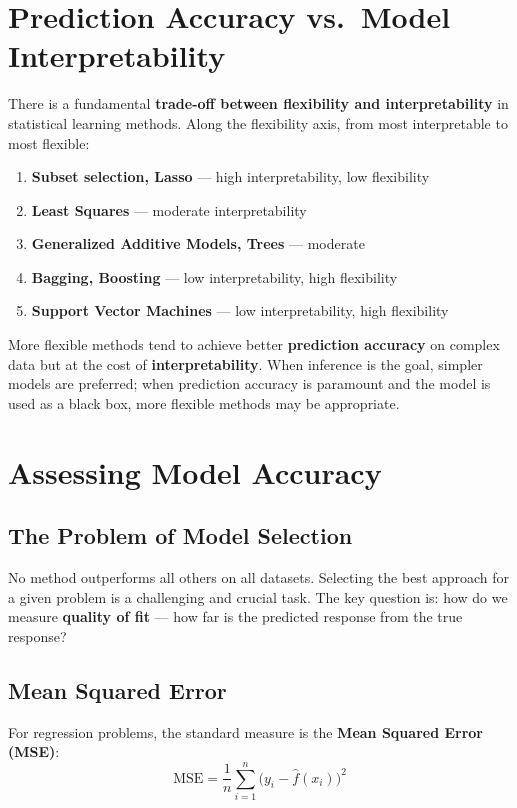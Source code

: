 \documentclass[11pt,a4paper]{article}
\theoremstyle{definition}
\theoremstyle{plain}
\theoremstyle{remark}
\begin{document}
\section{Prediction Accuracy vs.\ Model Interpretability}

There is a fundamental \textbf{trade-off between flexibility and interpretability} in statistical learning methods. Along the flexibility axis, from most interpretable to most flexible:

\begin{enumerate}
    \item \textbf{Subset selection, Lasso} — high interpretability, low flexibility
    \item \textbf{Least Squares} — moderate interpretability
    \item \textbf{Generalized Additive Models, Trees} — moderate
    \item \textbf{Bagging, Boosting} — low interpretability, high flexibility
    \item \textbf{Support Vector Machines} — low interpretability, high flexibility
\end{enumerate}

More flexible methods tend to achieve better \textbf{prediction accuracy} on complex data but at the cost of \textbf{interpretability}. When inference is the goal, simpler models are preferred; when prediction accuracy is paramount and the model is used as a black box, more flexible methods may be appropriate.


\section{Assessing Model Accuracy}

\subsection{The Problem of Model Selection}

No method outperforms all others on all datasets. Selecting the best approach for a given problem is a challenging and crucial task. The key question is: how do we measure \textbf{quality of fit} — how far is the predicted response from the true response?

\subsection{Mean Squared Error}

For regression problems, the standard measure is the \textbf{Mean Squared Error (MSE)}:
\[
    \mathrm{MSE} = \frac{1}{n} \sum_{i=1}^{n} \bigl(y_i - \hat{f}(x_i)\bigr)^2
\]
\end{document}
